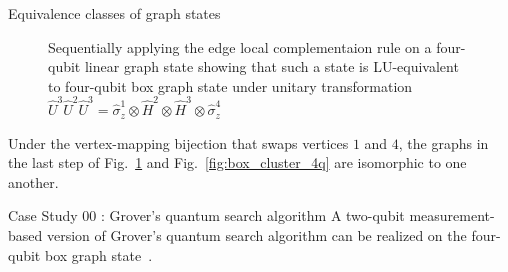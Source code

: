 \documentclass[final]{beamer}
\newlength{\colwidth}
\begin{document}
\begin{frame}[t]
\begin{columns}[t]
\begin{column}{\colwidth}
\begin{block}{Equivalence classes of graph states}
\begin{figure}[H]
\begin{subfigure}[b]{0.25\textwidth}
                        \end{subfigure}%
                        \begin{subfigure}[b]{0.25\textwidth}
                        \end{subfigure}
                        \caption{Sequentially applying the edge local complementaion
                            rule on a four-qubit linear graph state showing that such a
                            state is LU-equivalent to four-qubit box graph state under
                            unitary transformation $\hat{U}^{3}\hat{U}^{2}\hat{U}^{3} =
                            \hat{\sigma}^{1}_{z}\otimes\hat{H}^{2}\otimes\hat{H}^{3}\otimes\hat{\sigma}^{4}_z$}
                            \label{fig:edge_local_complementation_example}
                    \end{figure}

                    Under the vertex-mapping bijection that swaps vertices $1$ and $4$, the
                    graphs in the last step of
                    Fig.~\ref{fig:edge_local_complementation_example} and
                    Fig.~\ref{fig:box_cluster_4q} are isomorphic to one another.
                \end{block}
                \begin{block}{Case Study 00 : Grover's quantum search algorithm}
                    A two-qubit measurement-based version of Grover's quantum search algorithm can be realized
                    on the four-qubit box graph state~\cite{Walther_2005}.


\end{block}
\end{column}
\end{columns}
\end{frame}
\end{document}
